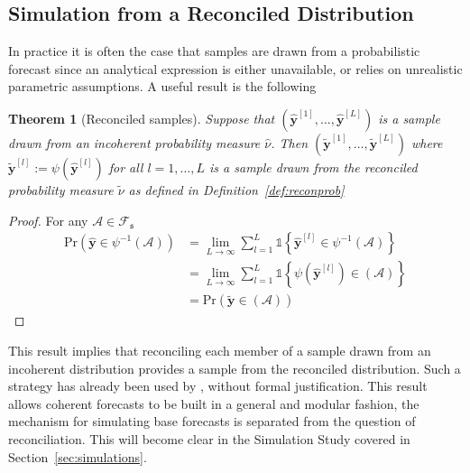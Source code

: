 \documentclass[12pt]{article}
\newtheorem{theo}{Theorem}[section]
\theoremstyle{definition}
\begin{document}
\subsection{Simulation from a Reconciled Distribution}\label{sec:SampleSolution}

In practice it is often the case that samples are drawn from a probabilistic forecast since an analytical expression is either unavailable, or relies on unrealistic parametric assumptions.  A useful result is the following
\begin{theo}[Reconciled samples]
	Suppose that $\left(\hat{\bm y}^{[1]},\ldots,\hat{\bm y}^{[L]}\right)$ is a sample drawn from an incoherent probability measure $\hat{\nu}$.  Then $\left(\tilde{\bm y}^{[1]},\ldots,\tilde{\bm y}^{[L]}\right)$ where $\tilde{\bm y}^{[l]}:=\psi(\hat{\bm y}^{[l]})$ for all $l=1,\ldots,L$ is a sample drawn from the reconciled probability measure $\tilde{\nu}$ as defined in Definition~\ref{def:reconprob}
\end{theo}
\begin{proof}
	For any $\mathcal{A}\in\mathscr{F}_{\mathfrak{s}}$
\begin{align}
	\mbox{Pr}(\hat{{\bm y}}\in\psi^{-1}(\mathcal{A}))&=\underset{L\rightarrow\infty}{\lim}\sum\limits_{l=1}^L\mathbb{1}\left\{\hat{\bm y}^{[l]}\in\psi^{-1}(\mathcal{A})\right\}\nonumber\\
	&=\underset{L\rightarrow\infty}{\lim}\sum\limits_{l=1}^L\mathbb{1}\left\{\psi(\hat{\bm y}^{[l]})\in(\mathcal{A})\right\}\nonumber\\
	&=\mbox{Pr}(\tilde{{\bm y}}\in(\mathcal{A}))\nonumber
\end{align}
\end{proof}

This result implies that reconciling each member of a sample drawn from an incoherent distribution provides a sample from the reconciled distribution.  Such a strategy has already been used by \cite{JeoEtAl2019}, without formal justification.  This result allows coherent forecasts to be built in a general and modular fashion, the mechanism for simulating base forecasts is separated from the question of reconciliation.  This will become clear in the Simulation Study covered in Section~\ref{sec:simulations}.

\end{document}
